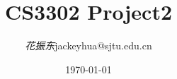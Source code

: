 \documentclass[12pt,a4paper]{ctexart}
\title{\textbf{CS3302 Project2}} %
\author{
\begin{tabular}{ll}
  \textit{花振东} & jackeyhua@sjtu.edu.cn \\
\end{tabular}
}
\date{\today} %
\begin{document}
\maketitle %

\tableofcontents


\pagebreak


%
%

\pagebreak


%
%
\end{document}
